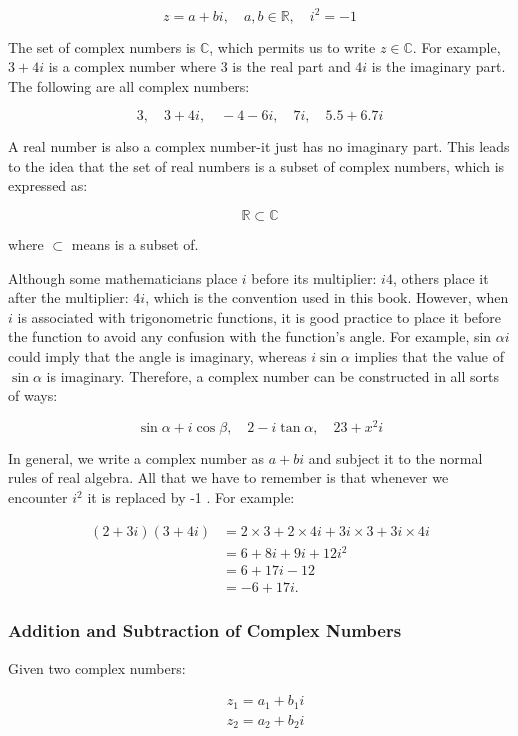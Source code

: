 \documentclass[10pt]{article}
\begin{document}
$$
z=a+b i, \quad a, b \in \mathbb{R}, \quad i^{2}=-1
$$

The set of complex numbers is $\mathbb{C}$, which permits us to write $z \in \mathbb{C}$. For example, $3+4 i$ is a complex number where 3 is the real part and $4 i$ is the imaginary part. The following are all complex numbers:

$$
3, \quad 3+4 i, \quad-4-6 i, \quad 7 i, \quad 5.5+6.7 i
$$

A real number is also a complex number-it just has no imaginary part. This leads to the idea that the set of real numbers is a subset of complex numbers, which is expressed as:

$$
\mathbb{R} \subset \mathbb{C}
$$

where $\subset$ means is a subset of.

Although some mathematicians place $i$ before its multiplier: $i 4$, others place it after the multiplier: $4 i$, which is the convention used in this book. However, when $i$ is associated with trigonometric functions, it is good practice to place it before the function to avoid any confusion with the function's angle. For example, sin $\alpha i$ could imply that the angle is imaginary, whereas $i \sin \alpha$ implies that the value of $\sin \alpha$ is imaginary. Therefore, a complex number can be constructed in all sorts of ways:

$$
\sin \alpha+i \cos \beta, \quad 2-i \tan \alpha, \quad 23+x^{2} i
$$

In general, we write a complex number as $a+b i$ and subject it to the normal rules of real algebra. All that we have to remember is that whenever we encounter $i^{2}$ it is replaced by -1 . For example:

$$
\begin{aligned}
(2+3 i)(3+4 i) & =2 \times 3+2 \times 4 i+3 i \times 3+3 i \times 4 i \\
& =6+8 i+9 i+12 i^{2} \\
& =6+17 i-12 \\
& =-6+17 i .
\end{aligned}
$$

\subsubsection{Addition and Subtraction of Complex Numbers}
Given two complex numbers:

$$
\begin{aligned}
& z_{1}=a_{1}+b_{1} i \\
& z_{2}=a_{2}+b_{2} i
\end{aligned}
$$
\end{document}
